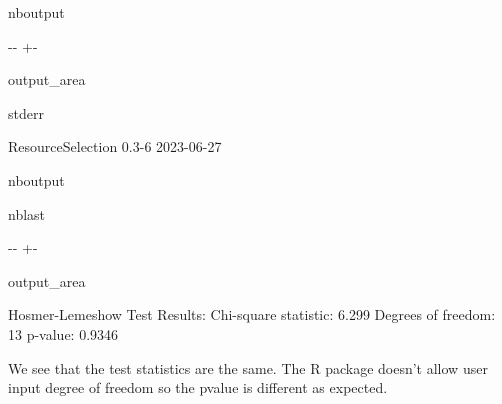 \documentclass[letterpaper,10pt,english]{sphinxmanual}
\begin{document}
\begin{sphinxuseclass}{nboutput}
{

\kern-\sphinxverbatimsmallskipamount\kern-\baselineskip
\kern+\FrameHeightAdjust\kern-\fboxrule
\vspace{\nbsphinxcodecellspacing}

\begin{sphinxuseclass}{output_area}
\begin{sphinxuseclass}{stderr}


\begin{sphinxVerbatim}[commandchars=\\\{\}]
ResourceSelection 0.3-6          2023-06-27

\end{sphinxVerbatim}



\end{sphinxuseclass}
\end{sphinxuseclass}
}

\end{sphinxuseclass}
\begin{sphinxuseclass}{nboutput}
\begin{sphinxuseclass}{nblast}
{

\kern-\sphinxverbatimsmallskipamount\kern-\baselineskip
\kern+\FrameHeightAdjust\kern-\fboxrule
\vspace{\nbsphinxcodecellspacing}

\begin{sphinxuseclass}{output_area}
\begin{sphinxuseclass}{}


\begin{sphinxVerbatim}[commandchars=\\\{\}]
Hosmer-Lemeshow Test Results:
Chi-square statistic: 6.299
Degrees of freedom: 13
p-value: 0.9346
\end{sphinxVerbatim}



\end{sphinxuseclass}
\end{sphinxuseclass}
}

\end{sphinxuseclass}
\end{sphinxuseclass}
\sphinxAtStartPar
We see that the test statistics are the same. The R package doesn’t allow user input degree of freedom so the p\sphinxhyphen{}value is different as expected.
\end{document}
